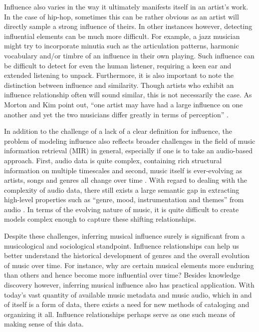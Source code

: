 Influence also varies in the way it ultimately manifests itself in an artist's work. In the case of hip-hop, sometimes this can be rather obvious as an artist will directly sample a strong influence of theirs. In other instances however, detecting influential elements can be much more difficult. For example, a jazz musician might try to incorporate minutia such as the articulation patterns, harmonic vocabulary and/or timbre of an influence in their own playing. Such influence can be difficult to detect for even the human listener, requiring a keen ear and extended listening to unpack. Furthermore, it is also important to note the distinction between influence and similarity. Though artists who exhibit an influence relationship often will sound similar, this is not necessarily the case. As Morton and Kim point out, ``one artist may have had a large influence on one another and yet the two musicians differ greatly in terms of perception'' \cite{morton2015acoustic}. 

In addition to the challenge of a lack of a clear definition for influence, the problem of modeling influence also reflects broader challenges in the field of music information retrieval (MIR) in general, especially if one is to take an audio-based approach. First, audio data is quite complex, containing rich structural information on multiple timescales and second, music itself is ever-evolving as artists, songs and genres all change over time \cite{shalit2013modeling}. With regard to dealing with the complexity of audio data, there still exists a large semantic gap in extracting high-level properties such as ``genre, mood, instrumentation and themes'' from audio  \cite{van2013deep}. In terms of the evolving nature of music, it is quite difficult to create models complex enough to capture these shifting relationships.

Despite these challenges, inferring musical influence surely is significant from a musicological and sociological standpoint. Influence relationships can help us better understand the historical development of genres and the overall evolution of music over time. For instance, why are certain musical elements more enduring than others and hence become more influential over time? Besides knowledge discovery however, inferring musical influence also has practical application. With today's vast quantity of available music metadata and music audio, which in and of itself is a form of data, there exists a need for new methods of cataloging and organizing it all. Influence relationships perhaps serve as one such means of making sense of this data.

